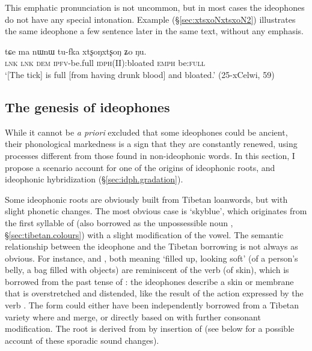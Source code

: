 This emphatic pronunciation is not uncommon, but in most cases the ideophones do not have any special intonation. Example (§\ref{sec:xtsxoNxtsxoN2}) illustrates the same ideophone  a few sentence later in the same text, without any emphasis.

\begin{exe}
\ex \label{sec:xtsxoNxtsxoN2}
\gll tɕe ma nɯnɯ tu-fka xtʂoŋxtʂoŋ ʑo ŋu. \\
\textsc{lnk} \textsc{lnk} \textsc{dem} \textsc{ipfv}-be.full \textsc{idph}(II):bloated \textsc{emph} be:\textsc{full} \\
\glt `[The tick] is full [from having drunk blood] and bloated.' (25-xCelwi, 59)
\end{exe}

\subsection{The genesis of ideophones} \label{sec:genesis.idph}
While it cannot be \textit{a priori} excluded that some ideophones could be ancient, their phonological markedness is a sign that they are constantly renewed, using processes different from those found in non-ideophonic words. In this section, I propose a scenario account for one of the origins of ideophonic roots, and  ideophonic hybridization (§\ref{sec:idph.gradation}).

Some ideophonic roots are obviously built from Tibetan loanwords, but with slight phonetic changes. The most obvious case is  `skyblue', which originates from the first syllable of  (also borrowed as the unpossessible noun , §\ref{sec:tibetan.colours}) with a slight modification of the vowel. The semantic relationship between the ideophone and the Tibetan borrowing is not always as obvious. For instance,  and , both meaning `filled up, looking soft' (of a person's belly, a bag filled with objects) are reminiscent of the verb  (of skin), which is borrowed from the past tense of : the ideophones describe a skin or membrane that is overstretched and distended, like the result of the action expressed by the verb . The form  could either have been independently borrowed from a Tibetan variety where  and  merge, or directly based on  with further consonant modification. The root  is derived from  by insertion of  (see below for a possible account of these sporadic sound changes).
 
